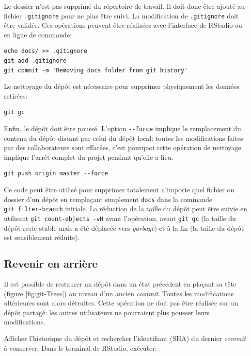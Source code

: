 \documentclass[
  12pt,
  french,
  a4paper,
  extrafontsizes,onecolumn,openright
  ]{memoir}
\newlength{\rf}
\begin{document}
Le dossier n'est pas supprimé du répertoire de travail.
Il doit donc être ajouté au fichier \texttt{.gitignore} pour ne plus être suivi.
La modification de \texttt{.gitignore} doit être validée.
Ces opérations peuvent être réalisées avec l'interface de RStudio ou en ligne de commande:

\begin{verbatim}
echo docs/ >> .gitignore
git add .gitignore
git commit -m 'Removing docs folder from git history'
\end{verbatim}

Le nettoyage du dépôt est nécessaire pour supprimer physiquement les données retirées:

\begin{verbatim}
git gc
\end{verbatim}

Enfin, le dépôt doit être poussé.
L'option \texttt{-\/-force} implique le remplacement du contenu du dépôt distant par celui du dépôt local: toutes les modifications faites par des collaborateurs sont effacées, c'est pourquoi cette opération de nettoyage implique l'arrêt complet du projet pendant qu'elle a lieu.

\begin{verbatim}
git push origin master --force
\end{verbatim}

Ce code peut être utilisé pour supprimer totalement n'importe quel fichier ou dossier d'un dépôt en remplaçant simplement \texttt{docs} dans la commande \texttt{git\ filter-branch} initiale.
La réduction de la taille du dépôt peut être suivie en utilisant \texttt{git\ count-objects\ -vH} avant l'opération, avant \texttt{git\ gc} (la taille du dépôt reste stable mais a été déplacée vers \emph{garbage}) et à la fin (la taille du dépôt est sensiblement réduite).

\subsection{Revenir en arrière}\label{revenir-en-arriuxe8re-1}

Il est possible de restaurer un dépôt dans un état précédent en plaçant sa tête (figure \ref{fig:git-Trees}) au niveau d'un ancien \emph{commit}.
Toutes les modifications ultérieures sont alors détruites.
Cette opération ne doit pas être réalisée sur un dépôt partagé: les autres utilisateurs ne pourraient plus pousser leurs modifications.

Afficher l'historique du dépôt et rechercher l'identifiant (SHA) du dernier \emph{commit} à conserver.
Dans le terminal de RStudio, exécuter:
\end{document}
